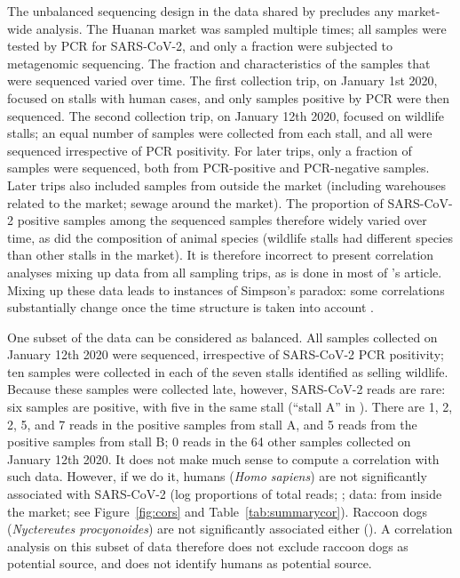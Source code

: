 \documentclass[11pt]{article}
\def \sct {\mbox{SARS-CoV-2}}
\begin{document}
The unbalanced sequencing design in the data shared by \citet{Liu2023Nature} precludes any market-wide analysis. The Huanan market was sampled multiple times; all samples were tested by PCR for \sct{}, and only a fraction were subjected to metagenomic sequencing. The fraction and characteristics of the samples that were sequenced varied over time. The first collection trip, on January 1st 2020, focused on stalls with human cases, and only samples positive by PCR were then sequenced. The second collection trip, on January 12th 2020, focused on wildlife stalls; an equal number of samples were collected from each stall, and all were sequenced irrespective of PCR positivity. For later trips, only a fraction of samples were sequenced, both from PCR-positive and PCR-negative samples. Later trips also included samples from outside the market (including warehouses related to the market; sewage around the market). The proportion of \sct{} positive samples among the sequenced samples therefore widely varied over time, as did the composition of animal species (wildlife stalls had different species than other stalls in the market). It is therefore incorrect to present correlation analyses mixing up data from all sampling trips, as is done in most of \citet{Bloom2023VE}'s article. Mixing up these data leads to instances of Simpson's paradox: some correlations substantially change once the time structure is taken into account \citep[Figure~S4]{ACC2023bioRxiv}.

One subset of the data can be considered as balanced. All samples collected on January 12th 2020 were sequenced, irrespective of \sct{} PCR positivity; ten samples were collected in each of the seven stalls identified as selling wildlife. Because these samples were collected late, however, \sct{} reads are rare: six samples are positive, with five in the same stall (``stall A'' in \citet{ACC2023bioRxiv}). There are 1, 2, 2, 5, and 7 reads in the positive samples from stall A, and 5 reads from the positive samples from stall B; 0 reads in the 64 other samples collected on January 12th 2020. It does not make much sense to compute a correlation with such data. However, if we do it, humans (\textit{Homo sapiens}) are not significantly associated with \sct{} (log proportions of total reads; \JBTwelfthSCHS{}; data: \citet{Bloom2023VE} from inside the market; see Figure~\ref{fig:cors} and Table~\ref{tab:summarycor}). Raccoon dogs (\textit{Nyctereutes procyonoides}) are not significantly associated either (\JBTwelfthSCRD{}). A correlation analysis on this subset of data therefore does not exclude raccoon dogs as potential source, and does not identify humans as potential source.
\end{document}
